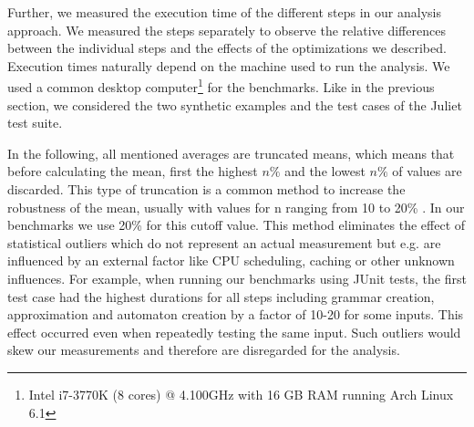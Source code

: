 Further, we measured the execution time of the different steps in our analysis approach. 
We measured the steps separately to observe the relative differences between the individual steps and the effects of the optimizations we described. Execution times naturally depend on the machine used to run the analysis. We used a common desktop computer\footnote{Intel i7-3770K (8 cores) @ 4.100GHz with 16 GB RAM running Arch Linux 6.1} for the benchmarks.
Like in the previous section, we considered the two synthetic examples and the test cases of the Juliet test suite.

In the following, all mentioned averages are truncated means, which means that before calculating the mean, first the highest $n\%$ and the lowest $n\%$ of values are discarded. This type of truncation is a common method to increase the robustness of the mean, usually with values for n ranging from 10 to 20\% \cite{krenel}. In our benchmarks we use 20\% for this cutoff value. This method eliminates the effect of statistical outliers which do not represent an actual measurement but e.g. are influenced by an external factor like CPU scheduling, caching or other unknown influences. For example, when running our benchmarks using JUnit tests, the first test case had the highest durations for all steps including grammar creation, approximation and automaton creation by a factor of 10-20 for some inputs. This effect occurred even when repeatedly testing the same input. Such outliers would skew our measurements and therefore are disregarded for the analysis.

